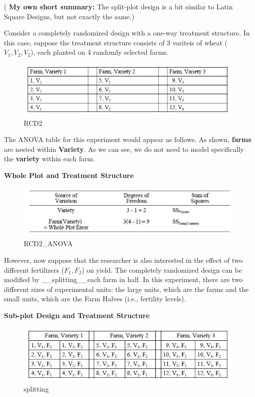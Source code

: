 \documentclass[]{book}
\begin{document}
( \textbf{My own short summary:} The split-plot design is a bit similar to Latin Square Designs, but not exactly the same.)

Consider a completely randomized design with a one-way treatment structure. In this case, suppose the treatment structure consists of 3 variteis of wheat (\(V_1,V_2,V_2\)), each planted on 4 randomly selected farms.

\begin{figure}
\centering
\includegraphics{RCD2.jpg}
\caption{RCD2}
\end{figure}

The ANOVA table for this experiment would appear as follows. As shown, \textbf{farms} are nested within \textbf{Variety}. As we can see, we do not need to model specifically the \textbf{variety} within each farm.

\textbf{Whole Plot and Treatment Structure}

\begin{figure}
\centering
\includegraphics{RCD2_ANOVA.jpg}
\caption{RCD2\_ANOVA}
\end{figure}

However, now suppose that the researcher is also interested in the effect of two different fertilizers (\(F_1, F_2\)) on yield. The completely randomized design can be modified by \_\_splitting\_\_each farm in half. In this experiment, there are two different sizes of experimental units: the large units, which are the farms and the small units, which are the Farm Halves (i.e., fertility levels).

\textbf{Sub-plot Design and Treatment Structure}

\begin{figure}
\centering
\includegraphics{splitting.jpg}
\caption{splitting}
\end{figure}
\end{document}
